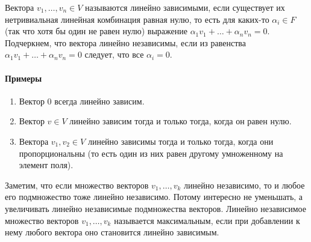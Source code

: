 \begin{definition}
Вектора $v_1,\ldots,v_n\in V$ называются линейно зависимыми, если существует их нетривиальная линейная комбинация равная нулю, то есть для каких-то $\alpha_i\in F$ (так что хотя бы один не равен нулю) выражение $\alpha_1 v_1+\ldots + \alpha_n v_n = 0$.
Подчеркнем, что вектора линейно независимы, если из равенства $\alpha_1 v_1 + \ldots + \alpha_n v_n = 0$ следует, что все $\alpha_i = 0$.
\end{definition}

\paragraph{Примеры}

\begin{enumerate}
\item Вектор $0$ всегда линейно зависим.

\item Вектор $v\in V$ линейно зависим тогда и только тогда, когда он равен нулю.

\item Вектора $v_1, v_2 \in V$ линейно зависимы тогда и только тогда, когда они пропорциональны (то есть один из них равен другому умноженному на элемент поля).
\end{enumerate}

Заметим, что если множество векторов $v_1,\ldots, v_k$ линейно независимо, то и любое его подмножество тоже линейно независимо.
Потому интересно не уменьшать, а увеличивать линейно независимые подмножества векторов.
Линейно независимое множество векторов $v_1,\ldots, v_k$ называется максимальным, если при добавлении к нему любого вектора оно становится линейно зависимым.
